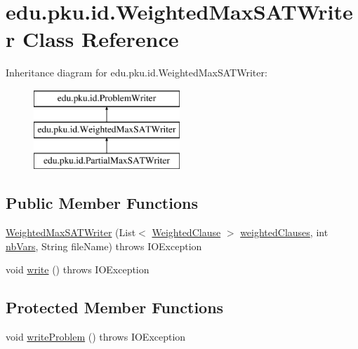 \hypertarget{classedu_1_1pku_1_1id_1_1_weighted_max_s_a_t_writer}{
\section{edu.pku.id.WeightedMaxSATWriter Class Reference}
\label{classedu_1_1pku_1_1id_1_1_weighted_max_s_a_t_writer}
}
Inheritance diagram for edu.pku.id.WeightedMaxSATWriter:\begin{figure}[H]
\begin{center}
\leavevmode
\includegraphics[height=3.000000cm]{classedu_1_1pku_1_1id_1_1_weighted_max_s_a_t_writer}
\end{center}
\end{figure}
\subsection*{Public Member Functions}
\begin{DoxyCompactItemize}
\item 
\hyperlink{classedu_1_1pku_1_1id_1_1_weighted_max_s_a_t_writer_a384ae98af244daa4374615d25ede7f87}{WeightedMaxSATWriter} (List$<$ \hyperlink{classedu_1_1pku_1_1id_1_1_weighted_clause}{WeightedClause} $>$ \hyperlink{classedu_1_1pku_1_1id_1_1_weighted_max_s_a_t_writer_a73dc99c36bfbaf938f3ffb7b95189d37}{weightedClauses}, int \hyperlink{classedu_1_1pku_1_1id_1_1_weighted_max_s_a_t_writer_ae9c3e5d651a1b8100fd5d85f00a18a54}{nbVars}, String fileName)  throws IOException 
\item 
void \hyperlink{classedu_1_1pku_1_1id_1_1_weighted_max_s_a_t_writer_a9ca988f376b3618c2b6b4724feb6a9f5}{write} ()  throws IOException 
\end{DoxyCompactItemize}
\subsection*{Protected Member Functions}
\begin{DoxyCompactItemize}
\item 
void \hyperlink{classedu_1_1pku_1_1id_1_1_weighted_max_s_a_t_writer_af39eb87193ec92810ed0cfcef4a4a626}{writeProblem} ()  throws IOException 
\end{DoxyCompactItemize}
